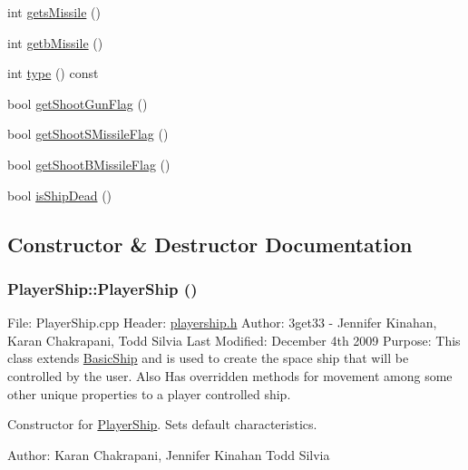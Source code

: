 \begin{DoxyCompactItemize}
\item 
int \hyperlink{class_player_ship_a57d57596b57715d14fc4c488b3911aef}{getsMissile} ()
\item 
int \hyperlink{class_player_ship_ac6e2929a3b840cd1fea30795b49d5063}{getbMissile} ()
\item 
int \hyperlink{class_player_ship_a81bc25f1369bf55d02c3f71b312b70a4}{type} () const 
\item 
bool \hyperlink{class_player_ship_ae5bc443b4609f8f0b691425960a9a419}{getShootGunFlag} ()
\item 
bool \hyperlink{class_player_ship_a06484c119b8aec9bd2b6758bb630c942}{getShootSMissileFlag} ()
\item 
bool \hyperlink{class_player_ship_af05e367beced958cbf5cac5bc67fd3f4}{getShootBMissileFlag} ()
\item 
bool \hyperlink{class_player_ship_a96bfd17f802f5d33d2083dad6c7240a0}{isShipDead} ()
\end{DoxyCompactItemize}


\subsection{Constructor \& Destructor Documentation}
\hypertarget{class_player_ship_a7e4ea77e9ad9182c6277575d82366719}{
\subsubsection[{PlayerShip}]{\setlength{\rightskip}{0pt plus 5cm}PlayerShip::PlayerShip ()}}
\label{class_player_ship_a7e4ea77e9ad9182c6277575d82366719}
File: PlayerShip.cpp Header: \hyperlink{playership_8h_source}{playership.h} Author: 3get33 -\/ Jennifer Kinahan, Karan Chakrapani, Todd Silvia Last Modified: December 4th 2009 Purpose: This class extends \hyperlink{class_basic_ship}{BasicShip} and is used to create the space ship that will be controlled by the user. Also Has overridden methods for movement among some other unique properties to a player controlled ship.

Constructor for \hyperlink{class_player_ship}{PlayerShip}. Sets default characteristics.

Author: Karan Chakrapani, Jennifer Kinahan Todd Silvia 

